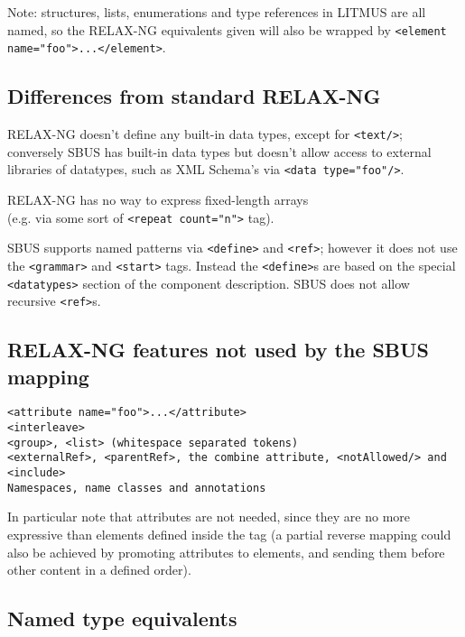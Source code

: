 \documentclass[12pt,a4paper,twoside]{article}
\renewcommand{\_}{\texttt{\symbol{95}}}
\begin{document}
Note: structures, lists, enumerations and type references in
LITMUS are all named, so the RELAX-NG equivalents given will
also be wrapped by \verb^<element name="foo">...</element>^.

\subsection{Differences from standard RELAX-NG}

RELAX-NG doesn't define any built-in data types, except for
\verb^<text/>^; conversely SBUS has built-in data types but
doesn't allow access to external libraries of datatypes,
such as XML Schema's via \verb^<data type="foo"/>^.

RELAX-NG has no way to express fixed-length arrays\\
(e.g. via some sort of \verb^<repeat count="n">^ tag).

SBUS supports named patterns via \verb^<define>^ and \verb^<ref>^;
however it does not use the \verb^<grammar>^ and \verb^<start>^ tags.
Instead the \verb^<define>^s are based on the special
\verb^<datatypes>^ section of the component description.
SBUS does not allow recursive \verb^<ref>^s.

\subsection{RELAX-NG features not used by the SBUS mapping}

\begin{verbatim}
<attribute name="foo">...</attribute>
<interleave>
<group>, <list> (whitespace separated tokens)
<externalRef>, <parentRef>, the combine attribute, <notAllowed/> and <include>
Namespaces, name classes and annotations
\end{verbatim}

In particular note that attributes are not needed, since they are no
more expressive than elements defined inside the tag (a partial reverse
mapping could also be achieved by promoting attributes to elements, and
sending them before other content in a defined order).

\subsection{Named type equivalents}
\end{document}
